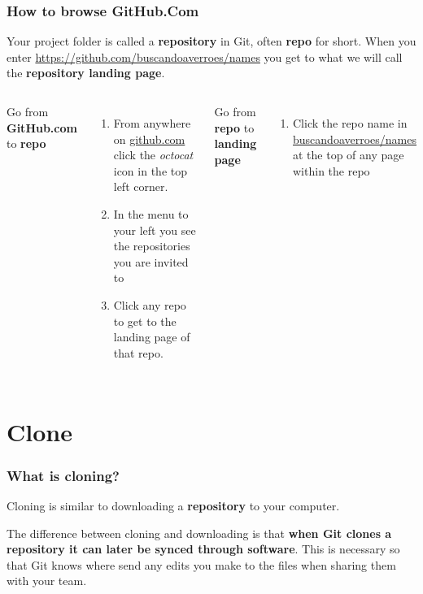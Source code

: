 \documentclass[aspectratio=169]{beamer} %
\newcommand{\trainingURL}[1]{{\color{blue}\url{#1}}}
\newcommand{\traininerUsername}{buscandoaverroes}
\newcommand{\repoName}{\traininerUsername/names}
\newcommand{\trainingRepoURL}[1]{\trainingURL{https://github.com/\repoName #1}}
\begin{document}
\begin{frame}
\frametitle{How to browse GitHub.Com}

	Your project folder is called a \textbf{repository} in Git, often \textbf{repo} for short.
	When you enter \trainingRepoURL{} you get to what we will call the \textbf{repository landing page}.

	\vspace{.5cm}

	\begin{columns}[T]

		Go from \textbf{GitHub.com} to \textbf{repo}
		\begin{enumerate}
			\item From anywhere on \trainingURL{github.com} click the \textit{octocat} icon in the top left corner.
			\item In the menu to your left you see the repositories you are invited to
			\item Click any repo to get to the landing page of that repo.
		\end{enumerate}

		Go from \textbf{repo} to \textbf{landing page}
		\begin{enumerate}
			\item Click the repo name in {\color{blue}\url{\repoName}} at the top of any page within the repo
		\end{enumerate}

	\end{columns}
\end{frame}

\section{Clone}

\begin{frame}
\frametitle{What is cloning?}

	Cloning is similar to downloading a \textbf{repository} to your computer.

	\vspace{.5cm}

	The difference between cloning and downloading is that \textbf{when Git clones a repository it can later be synced through software}. This is necessary so that Git knows where send any edits you make to the files when sharing them with your team.

\end{frame}
\end{document}
